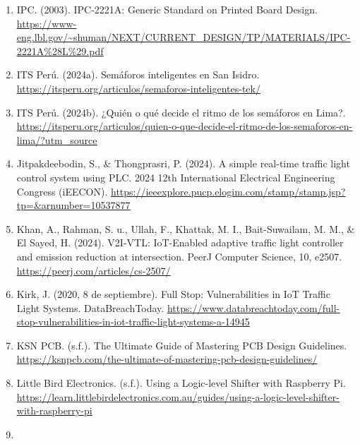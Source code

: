 \documentclass[12pt,a4paper,oneside]{report}
\providecommand{\ul}[1]{\underline{#1}}
\begin{document}
\begin{enumerate}
\item
  IPC. (2003). IPC-2221A: Generic Standard on Printed Board Design. \href{https://www-eng.lbl.gov/~shuman/NEXT/CURRENT_DESIGN/TP/MATERIALS/IPC-2221A\%28L\%29.pdf}{\ul{https://www-eng.lbl.gov/\textasciitilde shuman/NEXT/CURRENT\_DESIGN/TP/MATERIALS/IPC-2221A\%28L\%29.pdf}}
\item
  ITS Perú. (2024a). Semáforos inteligentes en San Isidro. \href{https://itsperu.org/articulos/semaforos-inteligentes-tek/}{\ul{https://itsperu.org/articulos/semaforos-inteligentes-tek/}}
\item
  ITS Perú. (2024b). ¿Quién o qué decide el ritmo de los semáforos en Lima?. \href{https://itsperu.org/articulos/quien-o-que-decide-el-ritmo-de-los-semaforos-en-lima/?utm_source}{\ul{https://itsperu.org/articulos/quien-o-que-decide-el-ritmo-de-los-semaforos-en-lima/?utm\_source}}
\item
  Jitpakdeebodin, S., \& Thongprasri, P. (2024). A simple real-time traffic light control system using PLC. 2024 12th International Electrical Engineering Congress (iEECON). \href{https://ieeexplore.pucp.elogim.com/stamp/stamp.jsp?tp=&arnumber=10537877}{\ul{https://ieeexplore.pucp.elogim.com/stamp/stamp.jsp?tp=\&arnumber=10537877}}
\item
  Khan, A., Rahman, S. u., Ullah, F., Khattak, M. I., Bait-Suwailam, M. M., \& El Sayed, H. (2024). V2I-VTL: IoT-Enabled adaptive traffic light controller and emission reduction at intersection. PeerJ Computer Science, 10, e2507. \href{https://peerj.com/articles/cs-2507/}{\ul{https://peerj.com/articles/cs-2507/}}
\item
  Kirk, J. (2020, 8 de septiembre). Full Stop: Vulnerabilities in IoT Traffic Light Systems. DataBreachToday. \href{https://www.databreachtoday.com/full-stop-vulnerabilities-in-iot-traffic-light-systems-a-14945}{\ul{https://www.databreachtoday.com/full-stop-vulnerabilities-in-iot-traffic-light-systems-a-14945}}
\item
  KSN PCB. (s.f.). The Ultimate Guide of Mastering PCB Design Guidelines. \href{https://ksnpcb.com/the-ultimate-of-mastering-pcb-design-guidelines/}{\ul{https://ksnpcb.com/the-ultimate-of-mastering-pcb-design-guidelines/}}
\item
  Little Bird Electronics. (s.f.). Using a Logic-level Shifter with Raspberry Pi. \href{https://learn.littlebirdelectronics.com.au/guides/using-a-logic-level-shifter-with-raspberry-pi}{\ul{https://learn.littlebirdelectronics.com.au/guides/using-a-logic-level-shifter-with-raspberry-pi}}
\item

\end{enumerate}
\end{document}
